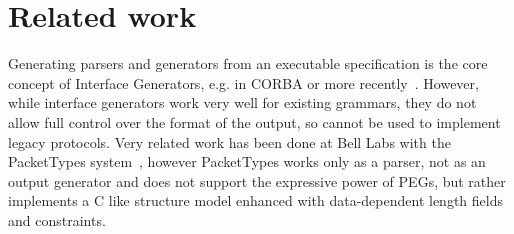 \section{Related work}

Generating parsers and generators from an executable specification is the core concept of Interface
Generators, e.g. in CORBA or more recently~\cite{varda2008}. However, while interface
generators work very well for existing grammars, they do not allow full control over the format of
the output, so cannot be used to implement legacy protocols.
Very related work has been done at Bell Labs with the PacketTypes system~\cite{mccann2000packet},
however PacketTypes works only as a parser, not as an output generator and does not support the expressive power of PEGs, but rather
implements a C like structure model enhanced with data-dependent length fields and constraints.

\begin{comment}

Memory corruption exploits (frequently) rely on placing controlled values at known (or controlled)
memory locations. Exploit countermeasures  like Address-Space Layout Randomisation~\cite{pax-aslr},
 heap cookies~\cite{heapcookies} or data execution prevention try to make this harder for
 an attacker. Attackers have developed techniques such as heap spraying~\cite{heapspray} and heap
 feng shui~\cite{fengshui} to help bypass those mitigations. 


Nail parsers use two arena allocators~\cite{arena}, one for the temporary syntax tree and one for the
result. If Nail were to use the normal system allocator, the attacker could cause two packets to be
parsed at the same time (or, given a sufficiently complicated input, two structure within the same
grammar to be parsed sequentially) such that the (invalid) intermediate results from one parse,  
 If there is a buffer overflow past the
end of one input, it is much harder for the attacker craft a sequence of packets to trick the allocator into
placing a known value next to that input.

\end{comment}
